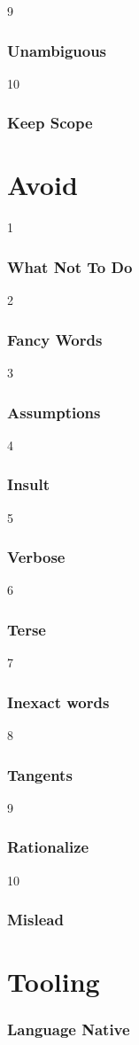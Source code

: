 9
\begin{frame}
\frametitle{Unambiguous}
\end{frame}

10
\begin{frame}
\frametitle{Keep Scope}
\end{frame}

\section{Avoid}

1
\begin{frame}
\frametitle{What Not To Do}
\end{frame}

2
\begin{frame}
\frametitle{Fancy Words}
\end{frame}

3
\begin{frame}
\frametitle{Assumptions}
\end{frame}

4
\begin{frame}
\frametitle{Insult}
\end{frame}

5
\begin{frame}
\frametitle{Verbose}
\end{frame}

6
\begin{frame}
\frametitle{Terse}
\end{frame}

7
\begin{frame}
\frametitle{Inexact words}
\end{frame}

8
\begin{frame}
\frametitle{Tangents}
\end{frame}

9
\begin{frame}
\frametitle{Rationalize}
\end{frame}

10
\begin{frame}
\frametitle{Mislead}
\end{frame}

\section{Tooling}

\begin{frame}
\frametitle{Language Native}
\end{frame}

